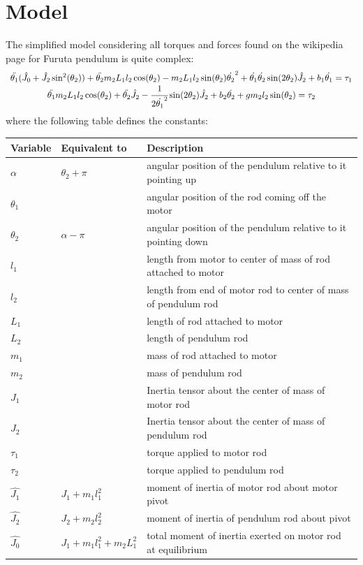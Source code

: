 \documentclass{article}
\begin{document}
\section*{Model}
The simplified model considering all torques and forces found on the wikipedia page for Furuta pendulum is quite complex:
\[\begin{array}{c}\ddot{\theta_1}(\hat{J_0}+\hat{J_2}\sin^2(\theta_2))+\ddot{\theta_2}m_2L_1l_2\cos(\theta_2)-m_2L_1l_2\sin(\theta_2)\dot{\theta_2}^2+\dot{\theta_1}\dot{\theta_2}\sin(2\theta_2)\hat{J_2}+b_1\dot{\theta_1}=\tau_1\\\ddot{\theta_1}m_2L_1l_2\cos(\theta_2)+\ddot{\theta_2}\hat{J_2}-\cfrac{1}{2\dot{\theta_1}^2}\sin(2\theta_2)\hat{J_2}+b_2\dot{\theta_2}+gm_2l_2\sin(\theta_2)=\tau_2\end{array}\]
where the following table defines the constants:
\begin{table}[H]
    \centering
    \begin{tabular}{|l|l|l|}
        \hline
        Variable & Equivalent to & Description\\[0.2ex]\hline
        $\alpha$ & $\theta_2+\pi$ & angular position of the pendulum relative to it pointing up\\[0.2ex]\hline
        $\theta_1$ &   & angular position of the rod coming off the motor\\[0.2ex]\hline
        $\theta_2$ & $\alpha-\pi$ & angular position of the pendulum relative to it pointing down\\[0.2ex]\hline
        $l_1$    & & length from motor to center of mass of rod attached to motor\\[0.2ex]\hline
        $l_2$ & & length from end of motor rod to center of mass of pendulum rod\\[0.2ex]\hline
        $L_1$ & & length of rod attached to motor\\[0.2ex]\hline
        $L_2$ & & length of pendulum rod\\[0.2ex]\hline
        $m_1$ & & mass of rod attached to motor\\[0.2ex]\hline
        $m_2$ & & mass of pendulum rod\\[0.2ex]\hline
        $J_1$ & & Inertia tensor about the center of mass of motor rod\\[0.2ex]\hline
        $J_2$ & & Inertia tensor about the center of mass of pendulum rod\\[0.2ex]\hline
        $\tau_1$ & & torque applied to motor rod\\[0.2ex]\hline
        $\tau_2$ & & torque applied to pendulum rod\\[0.2ex]\hline
        $\hat{J_1}$ &$J_1+m_1l_1^2$ & moment of inertia of motor rod about motor pivot\\[0.2ex]\hline
        $\hat{J_2}$ &$J_2+m_2l_2^2$ & moment of inertia of pendulum rod about pivot\\[0.2ex]\hline
        $\hat{J_0}$ &$J_1+m_1l_1^2+m_2L_1^2$ & total moment of inertia exerted on motor rod at equilibrium\\[0.2ex]\hline
    \end{tabular}
\end{table}
\end{document}
